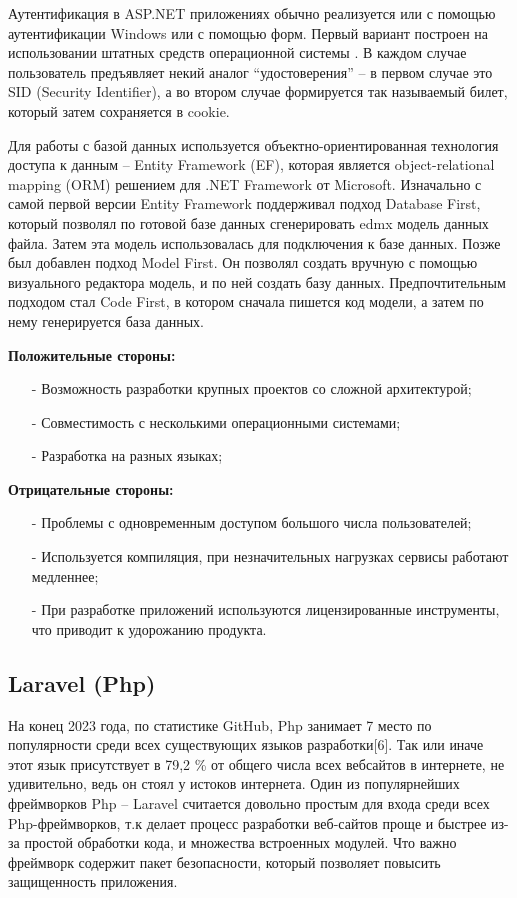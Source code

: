 Аутентификация в ASP.NET приложениях обычно реализуется или с помощью аутентификации Windows или с помощью форм. Первый
вариант построен на использовании штатных средств операционной системы . В каждом случае пользователь предъявляет некий
аналог “удостоверения” – в первом случае это SID (Security Identifier), а во втором случае формируется так называемый билет,
который затем сохраняется в cookie. 

Для работы с базой данных используется объектно-ориентированная технология доступа к данным -- Entity Framework (EF), которая 
является object-relational mapping (ORM) решением для .NET Framework от Microsoft. Изначально с самой первой версии Entity Framework поддерживал подход 
Database First, который позволял по готовой базе данных сгенерировать edmx модель данных файла. Затем эта модель использовалась для 
подключения к базе данных. Позже был добавлен подход Model First. Он позволял создать вручную с помощью визуального 
редактора модель, и по ней создать базу данных. Предпочтительным подходом стал Code First, в котором сначала пишется код 
модели, а затем по нему генерируется база данных.

\textbf{Положительные стороны:}
\begin{itemize}
  \item[-] Возможность разработки крупных проектов со сложной архитектурой;
  \item[-] Совместимость с несколькими операционными системами; 
  \item[-] Разработка на разных языках;
\end{itemize}


\textbf{Отрицательные стороны:}
\begin{itemize}
  \item[-] Проблемы с одновременным доступом большого числа пользователей;
  \item[-] Используется компиляция, при незначительных нагрузках сервисы работают медленнее;  
  \item[-] При разработке приложений используются лицензированные инструменты, что приводит к удорожанию продукта.
\end{itemize}


\subsection{Laravel (Php)}
На конец 2023 года, по статистике GitHub, Php занимает 7 место по популярности среди всех существующих языков разработки[6].
Так или иначе этот язык присутствует в 79,2 \% от общего числа всех вебсайтов в интернете, не удивительно, ведь он стоял у истоков интернета.
Один из популярнейших фреймворков Php -- Laravel считается довольно простым для входа среди всех Php-фреймворков, т.к делает процесс разработки веб-сайтов проще и быстрее из-за
простой обработки кода, и множества встроенных модулей. Что важно фреймворк содержит пакет безопасности, который позволяет повысить защищенность приложения.

